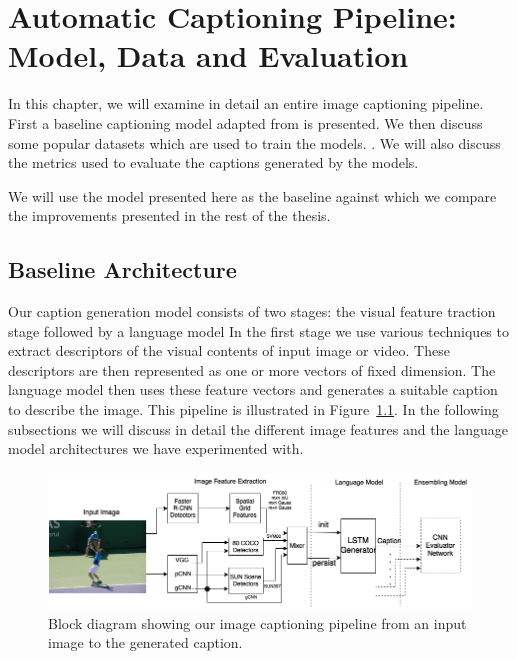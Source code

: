 \chapter{Automatic Captioning Pipeline: Model, Data and Evaluation}
\label{chapter:baseline}
In this chapter, we will examine in detail an entire image captioning
pipeline.
First a baseline captioning model adapted from
\cite{Vinyals_2015_CVPR} is presented. 
We then discuss some popular datasets which are used to train the
models. 
. 
We will also discuss the metrics used to evaluate the captions
generated by the models. 

We will use the model presented here as the baseline against which we compare
the improvements presented in the rest of the thesis.

\section{Baseline Architecture}
Our caption generation model consists of two stages: the visual feature
traction stage followed by a language model
In the first stage we use various techniques to extract descriptors of the
visual contents of input image or video. These descriptors are then represented
as one or more vectors of fixed dimension. 
The language model then uses these feature vectors and generates a suitable
caption to describe the image. 
This pipeline is illustrated in Figure~\ref{fig:fullModel}. 
In the following subsections we will discuss in detail the different
image features and the language model architectures we have
experimented with.

\begin{figure}[t]
  \begin{center}
      \hspace{-10mm}\includegraphics[width=1.2\linewidth]{images/AcMM_fullModel.png}
  \end{center}
  \vspace*{-3mm}
  \caption{Block diagram showing our image captioning pipeline from an
  input image to the generated caption.}
  \label{fig:fullModel}
\end{figure}

